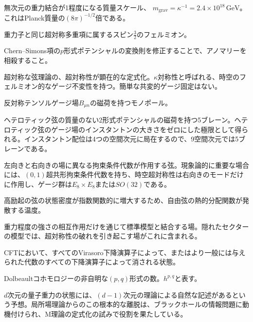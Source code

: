 {無次元の重力結合が1程度になる質量スケール、
$m_{\mathrm{grav}}=\kappa^{-1}=2.4\times10^{18}\,\mathrm{GeV}$。
これはPlanck質量の$(8\pi)^{-1/2}$倍である。}

{重力子と同じ超対称多重項に属するスピン$\frac32$のフェルミオン。}

{Chern--Simons項の$p$形式ポテンシャルの変換則を修正することで、アノマリーを相殺すること。}

{超対称な弦理論の、超対称性が顕在的な定式化。$\kappa$対称性と呼ばれる、時空のフェルミオン的なゲージ不変性を持つ。簡単な共変的ゲージ固定はない。}

{反対称テンソルゲージ場$B_{\mu n}$の磁荷を持つモノポール。}

{ヘテロティック弦の質量のない2形式ポテンシャルの磁荷を持つ5ブレーン。ヘテロティック弦のゲージ場のインスタントンの大きさをゼロにした極限として得られる。インスタントン配位は4つの空間次元に局在するので、9空間次元では5ブレーンである。}

{左向きと右向きの場に異なる拘束条件代数が作用する弦。現象論的に重要な場合には、$(0,1)$超共形拘束条件代数を持ち、時空超対称性は右向きのモードだけに作用し、ゲージ群は$E_8\times E_8$または$SO(32)$である。}

{高励起の弦の状態密度が指数関数的に増大するため、自由弦の熱的分配関数が発散する温度。}

{重力程度の強さの相互作用だけを通じて標準模型と結合する場。隠れたセクターの模型では、超対称性の破れを引き起こす場がこれに含まれる。}

{CFTにおいて、すべてのVirasoro下降演算子によって、またはより一般には与えられた代数のすべての下降演算子によって消される状態。}

{Dolbeaultコホモロジーの非自明な$(p,q)$形式の数。$h^{p,q}$と表す。}

{$d$次元の量子重力の状態には、$(d-1)$次元の理論による自然な記述があるという予想。局所場理論からのこの根本的な離脱は、ブラックホールの情報問題に動機付けられ、M理論の定式化の試みで役割を果たしている。}


